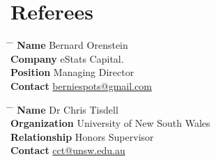 \documentclass[10pt,hidelinks]{article} %
\begin{document}


\section{Referees}

\parbox{0.5\textwidth}{ %
\begin{tabbing}
\hspace{2.75cm} \= \hspace{4cm} \= \kill %
{\bf Name} \> Bernard Orenstein \\ %
{\bf Company} \> eStats Capital. \\ %
{\bf Position} \> Managing Director \\ %
{\bf Contact} \> \href{mailto:berniespots@gmail.com}{berniespots@gmail.com} %
\end{tabbing}}
\hfill %
\parbox{0.5\textwidth}{ %
\begin{tabbing}
\hspace{2.75cm} \= \hspace{4cm} \= \kill %
{\bf Name} \> Dr Chris Tisdell\\ %
{\bf Organization} \> University of New South Wales \\ %
{\bf Relationship} \> Honors Supervisor \\ %
{\bf Contact} \> \href{mailto:cct@unsw.edu.au}{cct@unsw.edu.au} %
\end{tabbing}}

\end{document}
